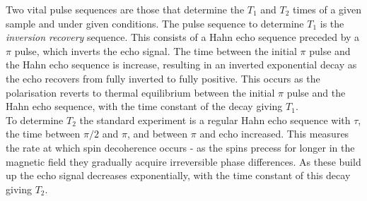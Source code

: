 Two vital pulse sequences are those that determine the $T_1$ and $T_2$ times of a given sample and under given conditions.
The pulse sequence to determine $T_1$ is the \emph{inversion recovery} sequence.
This consists of a Hahn echo sequence preceded by a $\pi$ pulse, which inverts the echo signal.
The time between the initial $\pi$ pulse and the Hahn echo sequence is increase, resulting in an inverted exponential decay as the echo recovers from fully inverted to fully positive.
This occurs as the polarisation reverts to thermal equilibrium between the initial $\pi$ pulse and the Hahn echo sequence, with the time constant of the decay giving $T_1$.
\\
To determine $T_2$ the standard experiment is a regular Hahn echo sequence with $\tau$, the time between $\pi/2$ and $\pi$, and between $\pi$ and echo increased.
This measures the rate at which spin decoherence occurs - as the spins precess for longer in the magnetic field they gradually acquire irreversible phase differences.
As these build up the echo signal decreases exponentially, with the time constant of this decay giving $T_2$.

